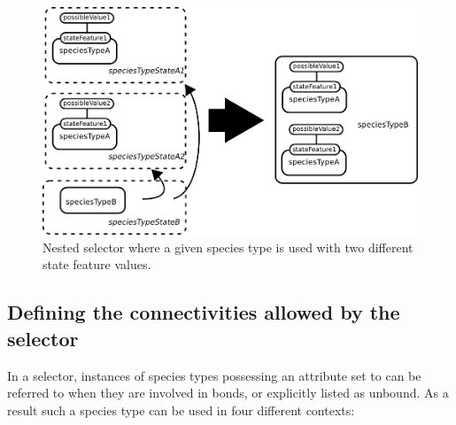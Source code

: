 \begin{figure}[H]
\begin{center}
\includegraphics[scale=0.7]{figs/pngs/ex_sts_differentStates.png} 
\caption{Nested selector where a given species type is used with two different state feature values.}
\label{fig:ex_sts_differentStates}
\end{center}
\end{figure}

\subsection{Defining the connectivities allowed by the selector}
 
In a selector, instances of species types possessing an attribute  set to  can be referred to when they are involved in bonds, or explicitly listed as unbound. As a result such a species type can be used in four different contexts:

